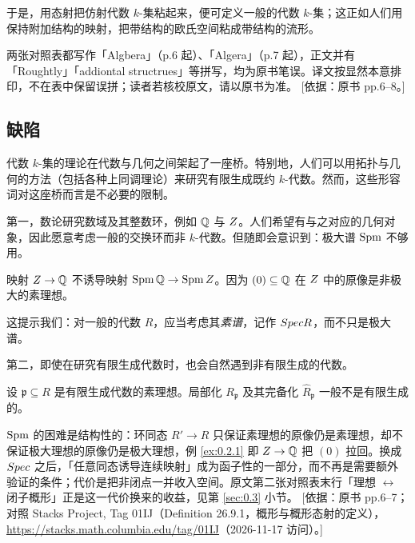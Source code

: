 于是，用态射把仿射代数 $k$-集粘起来，便可定义一般的代数 $k$-集；这正如人们用保持附加结构的映射，把带结构的欧氏空间粘成带结构的流形。

\begin{yizhu}
两张对照表都写作「Algbera」（p.6 起）、「Algera」（p.7 起），正文并有「Roughtly」「addiontal structrues」等拼写，均为原书笔误。译文按显然本意排印，不在表中保留误拼；读者若核校原文，请以原书为准。
[依据：原书 pp.6--8。]
\end{yizhu}

\subsection{缺陷}\label{sec:0.2}

代数 $k$-集的理论在代数与几何之间架起了一座桥。特别地，人们可以用拓扑与几何的方法（包括各种上同调理论）来研究有限生成既约 $k$-代数。然而，这些形容词对这座桥而言是不必要的限制。

第一，数论研究数域及其整数环，例如 $\mathbb{Q}$ 与 $Z$。人们希望有与之对应的几何对象，因此愿意考虑一般的交换环而非 $k$-代数。但随即会意识到：极大谱 $\operatorname{Spm}$ 不够用。

\begin{example}\label{ex:0.2.1}
映射 $Z \to \mathbb{Q}$ 不诱导映射 $\operatorname{Spm} \mathbb{Q} \to \operatorname{Spm} Z$。因为 $(0) \subseteq \mathbb{Q}$ 在 $Z$ 中的原像是非极大的素理想。
\end{example}

这提示我们：对一般的代数 $R$，应当考虑其\emph{素谱}，记作 $Spec R$，而不只是极大谱。

第二，即使在研究有限生成代数时，也会自然遇到非有限生成的代数。

\begin{example}\label{ex:0.2.2}
设 $\mathfrak p \subseteq R$ 是有限生成代数的素理想。局部化 $R_{\mathfrak p}$ 及其完备化 $\widehat{R}_{\mathfrak p}$ 一般不是有限生成的。
\end{example}

\begin{yizhu}
$\operatorname{Spm}$ 的困难是结构性的：环同态 $R' \to R$ 只保证素理想的原像仍是素理想，却不保证极大理想的原像仍是极大理想，例 \ref{ex:0.2.1} 即 $Z \to \mathbb{Q}$ 把 $(0)$ 拉回。换成 $Spec$ 之后，「任意同态诱导连续映射」成为函子性的一部分，而不再是需要额外验证的条件；代价是把非闭点一并收入空间。原文第二张对照表末行「理想 $\leftrightarrow$ 闭子概形」正是这一代价换来的收益，见第 \ref{sec:0.3} 小节。
[依据：原书 pp.6--7；对照 Stacks Project, Tag 01IJ（Definition 26.9.1，概形与概形态射的定义），\url{https://stacks.math.columbia.edu/tag/01IJ}（2026-11-17 访问）。]
\end{yizhu}

